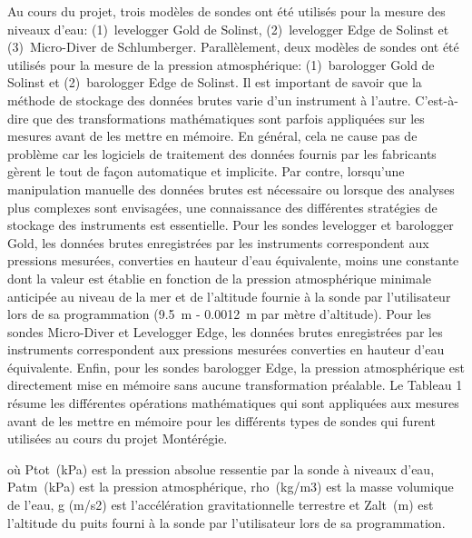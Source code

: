 \documentclass[WHATMANUAL.tex]{subfiles}
\begin{document}
Au cours du projet, trois modèles de sondes ont été utilisés pour la mesure des niveaux d’eau: (1) levelogger Gold de Solinst, (2) levelogger Edge de Solinst et (3) Micro-Diver de Schlumberger. Parallèlement, deux modèles de sondes ont été utilisés pour la mesure de la pression atmosphérique: (1) barologger Gold de Solinst et (2) barologger Edge de Solinst. Il est important de savoir que la méthode de stockage des données brutes varie d'un instrument à l'autre. C’est-à-dire que des transformations mathématiques sont parfois appliquées sur les mesures avant de les mettre en mémoire. En général, cela ne cause pas de problème car les logiciels de traitement des données fournis par les fabricants gèrent le tout de façon automatique et implicite. Par contre, lorsqu'une manipulation manuelle des données brutes est nécessaire ou lorsque des analyses plus complexes sont envisagées, une connaissance des différentes stratégies de stockage des instruments est essentielle.
Pour les sondes levelogger et barologger Gold, les données brutes enregistrées par les instruments correspondent aux pressions mesurées, converties en hauteur d'eau équivalente, moins une constante dont la valeur est établie en fonction de la pression atmosphérique minimale anticipée au niveau de la mer et de l'altitude fournie à la sonde par l'utilisateur lors de sa programmation (9.5 m - 0.0012 m par mètre d'altitude). Pour les sondes Micro-Diver et Levelogger Edge, les données brutes enregistrées par les instruments correspondent aux pressions mesurées converties en hauteur d'eau équivalente. Enfin, pour les sondes barologger Edge, la pression atmosphérique est directement mise en mémoire sans aucune transformation préalable. Le Tableau 1 résume les différentes opérations mathématiques qui sont appliquées aux mesures avant de les mettre en mémoire pour les différents types de sondes qui furent utilisées au cours du projet Montérégie.

où Ptot (kPa) est la pression absolue ressentie par la sonde à niveaux d'eau, Patm (kPa) est la pression atmosphérique, rho (kg/m3) est la masse volumique de l'eau, g (m/s2) est l'accélération gravitationnelle terrestre et Zalt (m) est l'altitude du puits fourni à la sonde par l'utilisateur lors de sa programmation.
\end{document}
